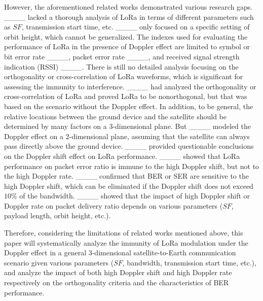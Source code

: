 However, the aforementioned related works demonstrated various research gaps. 
____ lacked a thorough analysis of LoRa in terms of different parameters such as $SF$, transmission start time, etc. ____ only focused on a specific setting of orbit height, which cannot be generalized. The indexes used for evaluating the performance of LoRa in the presence of Doppler effect are limited to symbol or bit error rate ____, packet error rate ____, and received signal strength indication (RSSI) ____. There is still no detailed analysis focusing on the orthogonality or cross-correlation of LoRa waveforms, which is significant for assessing the immunity to interference. ____ had analyzed the orthogonality or cross-correlation of LoRa and proved LoRa to be nonorthogonal, but that was based on the scenario without the Doppler effect. In addition, to be general, the relative locations between the ground device and the satellite should be determined by many factors on a 3-dimensional plane. But ____ modeled the Doppler effect on a 2-dimensional plane, assuming that the satellite can always pass directly above the ground device. 
____ provided questionable conclusions on the Doppler shift effect on LoRa performance. 
____ showed that LoRa performance on packet error ratio is immune to the high Doppler shift, but not to the high Doppler rate. ____ confirmed that BER or SER are sensitive to the high Doppler shift, which can be eliminated if the Doppler shift does not exceed $10$\% of the bandwidth. 
____ showed that the impact of high Doppler shift or Doppler rate on packet delivery ratio depends on various parameters ($SF$, payload length, orbit height, etc.).

Therefore, considering the limitations of related works mentioned above, this paper will systematically analyze the immunity of LoRa modulation under the Doppler effect in a general 3-dimensional satellite-to-Earth communication scenario given various parameters ($SF$, bandwidth, transmission start time, etc.), and analyze the impact of both high Doppler shift and high Doppler rate respectively on the orthogonality criteria and the characteristics of BER performance.